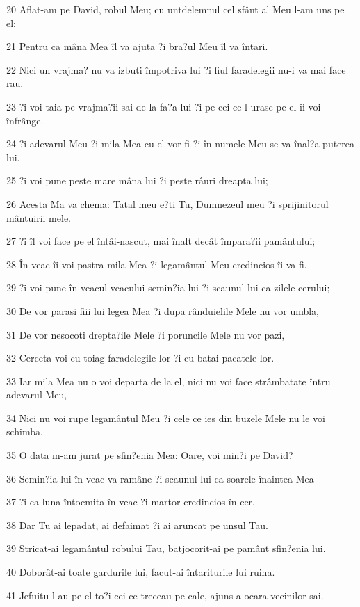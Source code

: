 \par 20 Aflat-am pe David, robul Meu; cu untdelemnul cel sfânt al Meu l-am uns pe el;
\par 21 Pentru ca mâna Mea îl va ajuta ?i bra?ul Meu îl va întari.
\par 22 Nici un vrajma? nu va izbuti împotriva lui ?i fiul faradelegii nu-i va mai face rau.
\par 23 ?i voi taia pe vrajma?ii sai de la fa?a lui ?i pe cei ce-l urasc pe el îi voi înfrânge.
\par 24 ?i adevarul Meu ?i mila Mea cu el vor fi ?i în numele Meu se va înal?a puterea lui.
\par 25 ?i voi pune peste mare mâna lui ?i peste râuri dreapta lui;
\par 26 Acesta Ma va chema: Tatal meu e?ti Tu, Dumnezeul meu ?i sprijinitorul mântuirii mele.
\par 27 ?i îl voi face pe el întâi-nascut, mai înalt decât împara?ii pamântului;
\par 28 În veac îi voi pastra mila Mea ?i legamântul Meu credincios îi va fi.
\par 29 ?i voi pune în veacul veacului semin?ia lui ?i scaunul lui ca zilele cerului;
\par 30 De vor parasi fiii lui legea Mea ?i dupa rânduielile Mele nu vor umbla,
\par 31 De vor nesocoti drepta?ile Mele ?i poruncile Mele nu vor pazi,
\par 32 Cerceta-voi cu toiag faradelegile lor ?i cu batai pacatele lor.
\par 33 Iar mila Mea nu o voi departa de la el, nici nu voi face strâmbatate întru adevarul Meu,
\par 34 Nici nu voi rupe legamântul Meu ?i cele ce ies din buzele Mele nu le voi schimba.
\par 35 O data m-am jurat pe sfin?enia Mea: Oare, voi min?i pe David?
\par 36 Semin?ia lui în veac va ramâne ?i scaunul lui ca soarele înaintea Mea
\par 37 ?i ca luna întocmita în veac ?i martor credincios în cer.
\par 38 Dar Tu ai lepadat, ai defaimat ?i ai aruncat pe unsul Tau.
\par 39 Stricat-ai legamântul robului Tau, batjocorit-ai pe pamânt sfin?enia lui.
\par 40 Doborât-ai toate gardurile lui, facut-ai întariturile lui ruina.
\par 41 Jefuitu-l-au pe el to?i cei ce treceau pe cale, ajuns-a ocara vecinilor sai.
